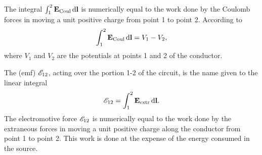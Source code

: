The integral $\int_{1}^{2} \vb{E}_{\text{Coul}} \, \dd \vb{l} $ is numerically equal to the work done by the Coulomb forces in moving a unit positive charge from point 1 to point 2. According to 
\begin{equation*}
 \int_{1}^{2} \vb{E}_{\text{Coul}} \, \dd \vb{l}  = V_{1} - V_{2},
\end{equation*}
where $V_{1}$ and $V_{2}$ are the potentials at points 1 and 2 of the conductor.

The  (emf) $\mathscr{E}_{12}$, acting over the portion 1-2 of the circuit, is the name given to the linear integral
\begin{equation*}
\mathscr{E}_{12} = \int_{1}^{2} \vb{E}_{\text{extr}} \, \dd \vb{l}.
\end{equation*}
The electromotive force $\mathscr{E}_{12}$ is numerically equal to the work done by the extraneous forces in moving a unit positive charge along the conductor from point 1 to point 2. This work is done at the expense of the energy consumed in the source.

